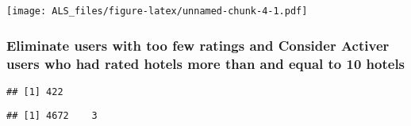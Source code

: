 \documentclass[]{article}
\newenvironment{Shaded}{\begin{snugshade}}{\end{snugshade}}
\newcommand{\DataTypeTok}[1]{\textcolor[rgb]{0.13,0.29,0.53}{#1}}
\newcommand{\DecValTok}[1]{\textcolor[rgb]{0.00,0.00,0.81}{#1}}
\newcommand{\KeywordTok}[1]{\textcolor[rgb]{0.13,0.29,0.53}{\textbf{#1}}}
\newcommand{\NormalTok}[1]{#1}
\newcommand{\OperatorTok}[1]{\textcolor[rgb]{0.81,0.36,0.00}{\textbf{#1}}}
\newcommand{\StringTok}[1]{\textcolor[rgb]{0.31,0.60,0.02}{#1}}
\begin{document}
\begin{Shaded}
\end{Shaded}

\texttt{[image: ALS\_files/figure-latex/unnamed-chunk-4-1.pdf]}

\hypertarget{eliminate-users-with-too-few-ratings-and-consider-activer-users-who-had-rated-hotels-more-than-and-equal-to-10-hotels}{%
\subsubsection{Eliminate users with too few ratings and Consider Activer
users who had rated hotels more than and equal to 10
hotels}\label{eliminate-users-with-too-few-ratings-and-consider-activer-users-who-had-rated-hotels-more-than-and-equal-to-10-hotels}}

\begin{Shaded}
\end{Shaded}

\begin{verbatim}
## [1] 422
\end{verbatim}

\begin{Shaded}
\end{Shaded}

\begin{verbatim}
## [1] 4672    3
\end{verbatim}
\end{document}
